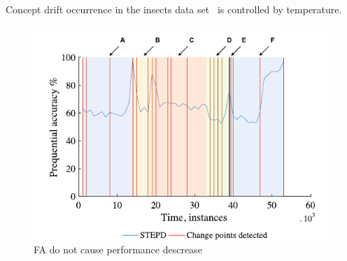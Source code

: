 \documentclass[12 pt]{article}
\begin{document}
Concept drift occurrence in the insects data set~\cite{SouzaRMB20} is controlled by temperature.
  \begin{figure}[htb!]
    \centering
    \includegraphics[height=0.4\textheight]{images_cropped/souza_fig28}
    \caption{FA do not cause performance descrease}
    \label{fig:fig28_souza}
  \end{figure}

  \newpage
  
  
\end{document}
